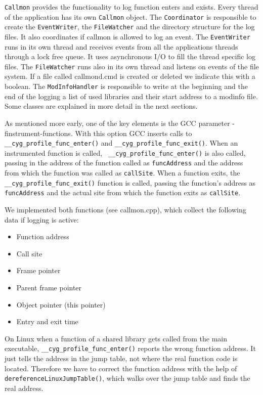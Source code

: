 \verb=Callmon= provides the functionality to log function enters and exists. Every thread of the application has its own \verb=Callmon= object. The \verb=Coordinator= is responsible to create the \verb=EventWriter=, the \verb=FileWatcher= and the directory structure for the log files. It also coordinates if callmon is allowed to log an event. The \verb=EventWriter= runs in its own thread and receives events from all the applications threads through a lock free queue. It uses asynchronous I/O to fill the thread specific log files. The \verb=FileWatcher= runs also in its own thread and listens on events of the file system. If a file called callmond.cmd is created or deleted we indicate this with a boolean. The \verb=ModInfoHandler= is responsible to write at the beginning and the end of the logging a list of used libraries and their start address to a modinfo file. Some classes are explained in more detail in the next sections.

As mentioned more early, one of the key elements is the GCC parameter -finstrument-functions. With this option GCC inserts calls to \verb= __cyg_profile_func_enter()= and \verb=__cyg_profile_func_exit()=. When an instrumented function is called, \verb= __cyg_profile_func_enter()= is also called, passing in the address of the function called as \verb=funcAddress= and the address from which the function was called as \verb=callSite=. When a function exits, the \verb=__cyg_profile_func_exit()= function is called, passing the function's address as \verb=funcAddress= and the actual site from which the function exits as \verb=callSite=.

We implemented both functions (see callmon.cpp), which collect the following data if logging is active:
\begin{itemize}
	\item Function address
	\item Call site
	\item Frame pointer
	\item Parent frame pointer
	\item Object pointer (this pointer)
	\item Entry and exit time
\end{itemize}

On Linux when a function of a shared library gets called from the main executable, \verb=__cyg_profile_func_enter()= reports the wrong function address. It just tells the address in the jump table, not where the real function code is located. Therefore we have to correct the function address with the help of \verb=dereferenceLinuxJumpTable()=, which walks over the jump table and finds the real address.

